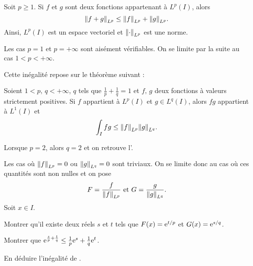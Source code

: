 \begin{theo}
Soit $p \geq 1$. Si $f$ et $g$ sont deux fonctions appartenant à $L^p(I)$, alors
\[
\norm{f + g}_{L^p} \leq \norm{f}_{L^p} + \norm{g}_{L^p}.
\]
Ainsi, $L^p(I)$ est un espace vectoriel et $\norm{\cdot}_{L^p}$ est une norme.
\end{theo}

\begin{remarque}
Les cas $p = 1$ et $p = +\infty$ sont aisément vérifiables. On se limite par la suite au cas $1 < p < +\infty$.
\end{remarque}

Cette inégalité repose sur le théorème suivant :
\begin{theo}
Soient $1 < p,\, q < +\infty$, $q$ tels que $\frac{1}{p} + \frac{1}{q} = 1$ et $f,\, g$ deux fonctions à valeurs strictement positives. Si $f$ appartient à $L^p(I)$ et $g \in L^q(I)$, alors $f g$ appartient à $L^1(I)$ et
\[
\int_I f g \leq \norm{f}_{L^p} \norm{g}_{L^q}.
\]
\end{theo}

\begin{remarque}
Lorsque $p = 2$, alors $q = 2$ et on retrouve l'.
\end{remarque}

\begin{exercice}
Les cas où $\norm{f}_{L^p} = 0$ ou $\norm{g}_{L^q} = 0$ sont triviaux. On se limite donc au cas où ces quantités sont non nulles et on pose
\[
F = \frac{f}{\norm{f}_{L^p}}
\text{ et }
G = \frac{g}{\norm{g}_{L^q}}.
\]
Soit $x \in I$.
\begin{questions}
\item Montrer qu'il existe deux réels $s$ et $t$ tels que $F(x) = \mathrm{e}^{t/p}$ et $G(x) = \mathrm{e}^{s/q}$.

\item Montrer que $\mathrm{e}^{\frac{s}{p} + \frac{t}{q}} \leq \frac{1}{p} \mathrm{e}^s + \frac{1}{q} \mathrm{e}^t$.

\item En déduire l'inégalité de .
\end{questions}
\end{exercice}

